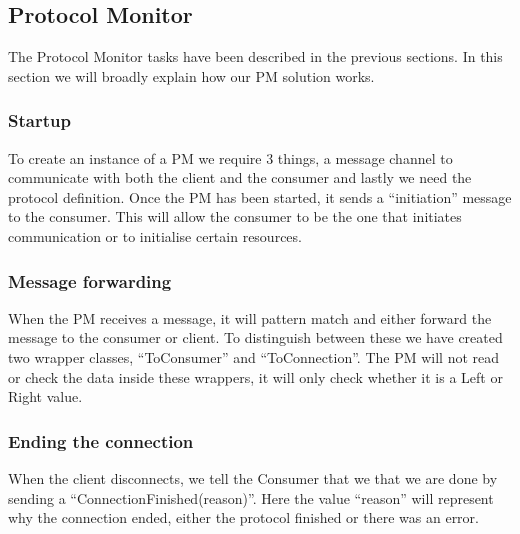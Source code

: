
\subsection{Protocol Monitor}
The Protocol Monitor tasks have been described in the previous sections. In this section we will broadly explain how our PM solution works.
\subsubsection{Startup}
To create an instance of a PM we require 3 things, a message channel to communicate with both the client and the consumer and lastly we need the protocol definition. Once the PM has been started, it sends a ``initiation'' message to the consumer. This will allow the consumer to be the one that initiates communication or to initialise certain resources.

\subsubsection{Message forwarding}
When the PM receives a message, it will pattern match and either forward the message to the consumer or client. To distinguish between these we have created two wrapper classes, ``ToConsumer'' and ``ToConnection''. The PM will not read or check the data inside these wrappers, it will only check whether it is a Left or Right value. 
\subsubsection{Ending the connection}
When the client disconnects, we tell the Consumer that we that we are done by sending a ``ConnectionFinished(reason)''. Here the value ``reason'' will represent why the connection ended, either the protocol finished or there was an error.

%





